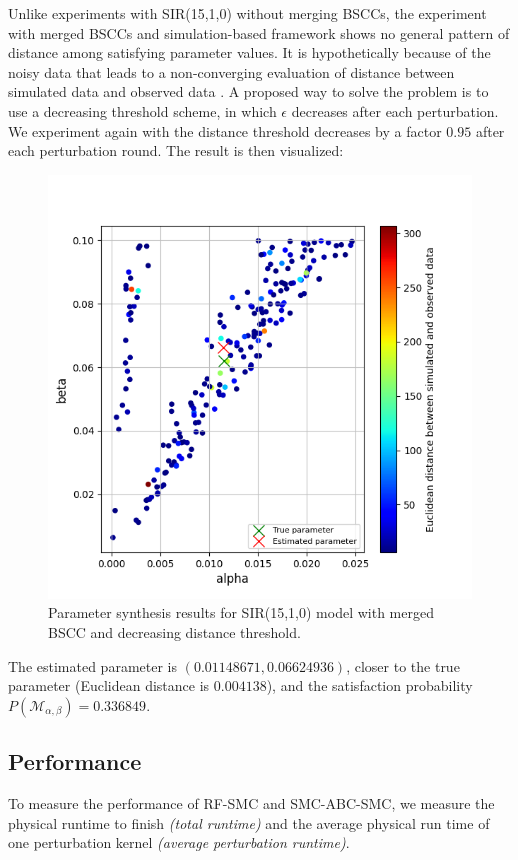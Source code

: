 Unlike experiments with SIR(15,1,0) without merging BSCCs, the experiment with merged BSCCs and
simulation-based framework shows no general pattern of distance among satisfying parameter values.
It is hypothetically because of the noisy data that leads to a non-converging evaluation of distance
between simulated data and observed data \cite{sisson2007sequential}. A proposed way to solve the
problem is to use a decreasing threshold scheme, in which $\epsilon$ decreases after each
perturbation. We experiment again with the distance threshold decreases by a factor $0.95$ after
each perturbation round. The result is then visualized:
\begin{figure}[H]
    \centering
    \includegraphics[width=0.5\linewidth]{figures/sir1510_merged_bscc_abcsmc_mod.png}
    \caption{Parameter synthesis results for SIR(15,1,0) model with merged BSCC and decreasing distance threshold.}
\end{figure}
The estimated parameter is $(0.01148671, 0.06624936)$, closer to the true parameter (Euclidean
distance is $0.004138$), and the satisfaction probability $P(\mathcal{M}_{\alpha,\beta}) = 0.336849$.

\subsection{Performance}
To measure the performance of RF-SMC and SMC-ABC-SMC, we measure the physical runtime to finish
\textit{(total runtime)} and the average physical run time of one perturbation kernel
\textit{(average perturbation runtime)}.

